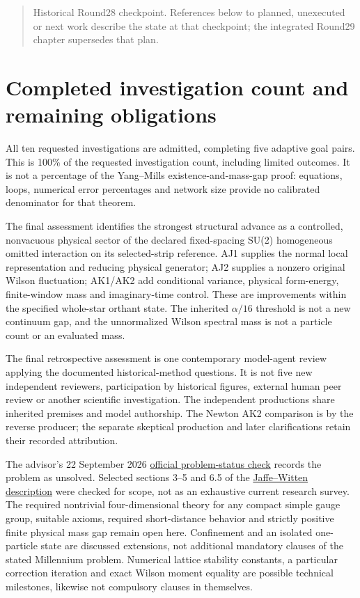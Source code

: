\begin{quote}\small Historical Round28 checkpoint. References below to planned, unexecuted or next work describe the state at that checkpoint; the integrated Round29 chapter supersedes that plan.\end{quote}
\section{Completed investigation count and remaining obligations}
\label{r28:sec:closeout}
All ten requested investigations are admitted, completing five adaptive goal pairs. This is 100\% of the requested investigation count, including limited outcomes. It is not a percentage of the Yang--Mills existence-and-mass-gap proof: equations, loops, numerical error percentages and network size provide no calibrated denominator for that theorem.

The final assessment identifies the strongest structural advance as a controlled, nonvacuous physical sector of the declared fixed-spacing SU(2) homogeneous omitted interaction on its selected-strip reference. AJ1 supplies the normal local representation and reducing physical generator; AJ2 supplies a nonzero original Wilson fluctuation; AK1/AK2 add conditional variance, physical form-energy, finite-window mass and imaginary-time control. These are improvements within the specified whole-star orthant state. The inherited $\alpha/16$ threshold is not a new continuum gap, and the unnormalized Wilson spectral mass is not a particle count or an evaluated mass.

The final retrospective assessment is one contemporary model-agent review applying the documented historical-method questions. It is not five new independent reviewers, participation by historical figures, external human peer review or another scientific investigation. The independent productions share inherited premises and model authorship. The Newton AK2 comparison is by the reverse producer; the separate skeptical production and later clarifications retain their recorded attribution.

The advisor's 22 September 2026 \href{https://www.claymath.org/millennium/yang-mills-the-maths-gap/}{official problem-status check} records the problem as unsolved. Selected sections 3--5 and 6.5 of the \href{https://www.claymath.org/wp-content/uploads/2022/06/yangmills.pdf}{Jaffe--Witten description} were checked for scope, not as an exhaustive current research survey. The required nontrivial four-dimensional theory for any compact simple gauge group, suitable axioms, required short-distance behavior and strictly positive finite physical mass gap remain open here. Confinement and an isolated one-particle state are discussed extensions, not additional mandatory clauses of the stated Millennium problem. Numerical lattice stability constants, a particular correction iteration and exact Wilson moment equality are possible technical milestones, likewise not compulsory clauses in themselves.

